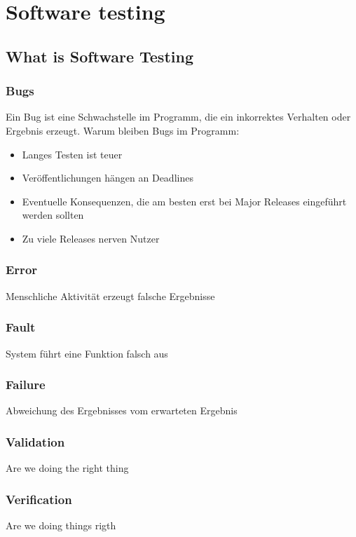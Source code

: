 \section{Software testing}
\subsection{What is Software Testing}
\subsubsection{Bugs}
Ein Bug ist eine Schwachstelle im Programm, die ein inkorrektes Verhalten oder Ergebnis erzeugt. \newline
Warum bleiben Bugs im Programm:
\begin{itemize}
	\item Langes Testen ist teuer
	\item Veröffentlichungen hängen an Deadlines
	\item Eventuelle Konsequenzen, die am besten erst bei Major Releases eingeführt werden sollten
	\item Zu viele Releases nerven Nutzer
\end{itemize}
\subsubsection{Error}
Menschliche Aktivität erzeugt falsche Ergebnisse
\subsubsection{Fault}
System führt eine Funktion falsch aus
\subsubsection{Failure}
Abweichung des Ergebnisses vom erwarteten Ergebnis
\subsubsection{Validation}
Are we doing the right thing
\subsubsection{Verification}
Are we doing things rigth
